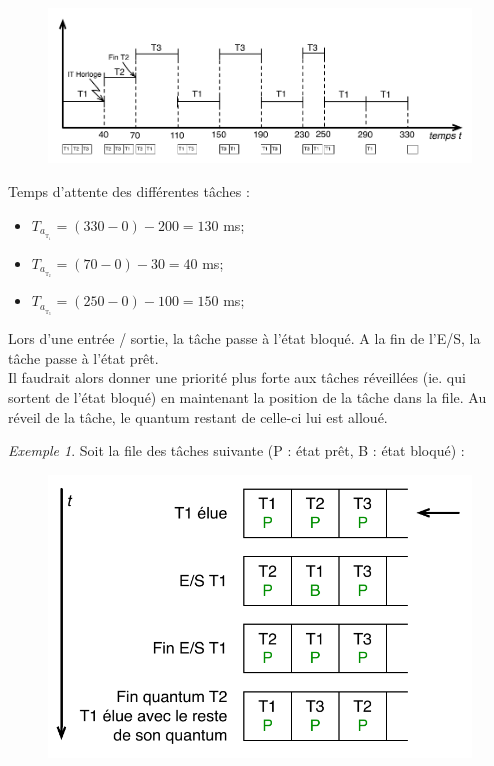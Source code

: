 \documentclass[11pt,english,french]{scrreprt}
\theoremstyle{remark}
\newtheorem*{ex*}{Exemple}
\theoremstyle{definition}
\begin{document}
\begin{figure}[h!]
	\center
	\includegraphics[scale=.65]{img/round-robbin}
\end{figure}

Temps d'attente des différentes tâches :\begin{itemize}
	\item $T_{a_{_{\mathrm{T}_{1}}}} = (330-0)-200=130$ ms;
	\item $T_{a_{_{\mathrm{T}_{2}}}} = (70-0)-30=40$ ms;
	\item $T_{a_{_{\mathrm{T}_{3}}}} = (250-0)-100=150$ ms;
\end{itemize}

Lors d'une entrée / sortie, la tâche passe à l'état bloqué. A la fin de l'E/S, la tâche passe à l'état prêt.\\
Il faudrait alors donner une priorité plus forte aux tâches réveillées (ie. qui sortent de l'état bloqué) en maintenant la position de la tâche dans la file. Au réveil de la tâche, le quantum restant de celle-ci lui est alloué.

\begin{ex*}
	Soit la file des tâches suivante (P : état prêt, B : état bloqué) : 
	\begin{figure}[h!]
		\center
		\vspace{-10pt}
		\includegraphics[scale=.50]{img/FIFO}
		\vspace{-10pt}
	\end{figure}
\end{ex*}
\end{document}

